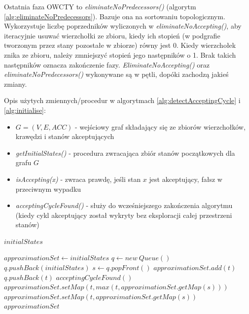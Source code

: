 Ostatnia faza OWCTY to \textit{eliminateNoPredecessors()} (algorytm \ref{alg:eliminateNoPredecessors}).
Bazuje ona na sortowaniu topologicznym.
Wykorzystuje liczbę poprzedników wyliczonych w \textit{eliminateNoAccepting()}, aby iteracyjnie usuwać wierzchołki ze zbioru, kiedy ich stopień (w podgrafie tworzonym przez stany pozostałe w zbiorze) równy jest 0.
Kiedy wierzchołek znika ze zbioru, należy zmniejszyć stopień jego następników o 1.
Brak takich następników oznacza zakończenie fazy.
\textit{EliminateNoAccepting()} oraz \textit{eliminateNoPredecessors()} wykonywane są w pętli, dopóki zachodzą jakieś zmiany.

Opis użytych zmiennych/procedur w algorytmach \ref{alg:detectAcceptingCycle} i \ref{alg:initialise}:
\begin{itemize}
\item $ G = (V,E,ACC) $ - wejściowy graf składający się ze zbiorów wierzchołków, krawędzi i stanów akceptujących
\item \textit{getInitialStates()} - procedura zwracająca zbiór stanów początkowych dla grafu $G$
\item \textit{isAccepting(x)} - zwraca prawdę, jeśli stan $x$ jest akceptujący, fałsz w przeciwnym wypadku
\item \textit{acceptingCycleFound()} - służy do wcześniejszego zakończenia algorytmu (kiedy cykl akceptujący został wykryty bez eksploracji całej przestrzeni stanów)
\end{itemize}

\begin{algorithm}
\caption{$ initialise(initialStates) $}
\label{alg:initialise}
\begin{algorithmic}[1]
\REQUIRE $ initialStates $

\STATE $ approximationSet \leftarrow initialStates $
\STATE $ q \leftarrow new\ Queue() $
\STATE $ q.pushBack(initialStates) $
  \STATE $ s \leftarrow q.popFront() $
      \STATE $ approximationSet.add(t) $
      \STATE $ q.pushBack(t) $
    \ENDIF
        \STATE $ acceptingCycleFound() $
        \RETURN
      \ENDIF
      \STATE $ approximationSet.setMap(t, max(t, approximationSet.getMap(s))) $
    \ELSE
      \STATE $ approximationSet.setMap(t, approximationSet.getMap(s)) $
    \ENDIF
  \ENDFOR
\ENDWHILE
\RETURN $ approximationSet $
\end{algorithmic}
\end{algorithm}


